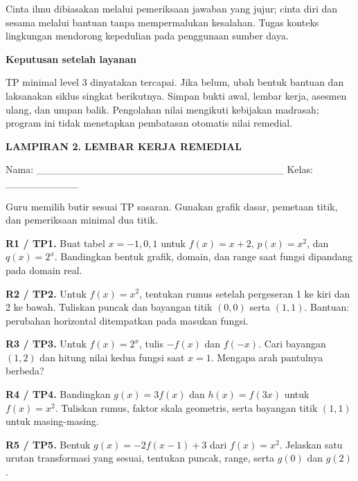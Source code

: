 \documentclass[11pt,a4paper]{article}
\begin{document}
{\small Cinta ilmu dibiasakan melalui pemeriksaan jawaban yang jujur; cinta diri dan sesama melalui bantuan tanpa mempermalukan kesalahan. Tugas konteks lingkungan mendorong kepedulian pada penggunaan sumber daya.\par}\medskip
\par\medskip\noindent\textbf{Keputusan setelah layanan}\par\smallskip
TP minimal level 3 dinyatakan tercapai. Jika belum, ubah bentuk bantuan dan laksanakan siklus singkat berikutnya. Simpan bukti awal, lembar kerja, asesmen ulang, dan umpan balik. Pengolahan nilai mengikuti kebijakan madrasah; program ini tidak menetapkan pembatasan otomatis nilai remedial.\par\medskip
\clearpage
\begin{center}\bfseries\large LAMPIRAN 2. LEMBAR KERJA REMEDIAL\end{center}\medskip
{\small Nama: \_\_\_\_\_\_\_\_\_\_\_\_\_\_\_\_\_\_\_\_\_\_\_\_\_\_\_\_\_\_\_\_\_\_  Kelas: \_\_\_\_\_\_\_\_\_\_\par}\medskip
{\small Guru memilih butir sesuai TP sasaran. Gunakan grafik dasar, pemetaan titik, dan pemeriksaan minimal dua titik.\par}\medskip
\noindent\textbf{R1 / TP1.} Buat tabel \(x=-1,0,1\) untuk \(f(x)=x+2\), \(p(x)=x^2\), dan \(q(x)=2^x\). Bandingkan bentuk grafik, domain, dan range saat fungsi dipandang pada domain real.\par\vspace{9mm}
\noindent\textbf{R2 / TP2.} Untuk \(f(x)=x^2\), tentukan rumus setelah pergeseran 1 ke kiri dan 2 ke bawah. Tuliskan puncak dan bayangan titik \((0,0)\) serta \((1,1)\). Bantuan: perubahan horizontal ditempatkan pada masukan fungsi.\par\vspace{9mm}
\noindent\textbf{R3 / TP3.} Untuk \(f(x)=2^x\), tulis \(-f(x)\) dan \(f(-x)\). Cari bayangan \((1,2)\) dan hitung nilai kedua fungsi saat \(x=1\). Mengapa arah pantulnya berbeda?\par\vspace{9mm}
\noindent\textbf{R4 / TP4.} Bandingkan \(g(x)=3f(x)\) dan \(h(x)=f(3x)\) untuk \(f(x)=x^2\). Tuliskan rumus, faktor skala geometris, serta bayangan titik \((1,1)\) untuk masing-masing.\par\vspace{9mm}
\noindent\textbf{R5 / TP5.} Bentuk \(g(x)=-2f(x-1)+3\) dari \(f(x)=x^2\). Jelaskan satu urutan transformasi yang sesuai, tentukan puncak, range, serta \(g(0)\) dan \(g(2)\).\par\vspace{9mm}
\end{document}
